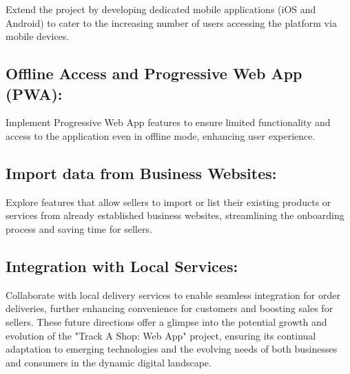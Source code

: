 Extend the project by developing dedicated mobile applications (iOS and Android) to cater to the increasing number of users accessing the platform via mobile devices.

\subsection{Offline Access and Progressive Web App (PWA):}

Implement Progressive Web App features to ensure limited functionality and access to the application even in offline mode, enhancing user experience.

\subsection{Import data from Business Websites:}

Explore features that allow sellers to import or list their existing products or services from already established business websites, streamlining the onboarding process and saving time for sellers.

\subsection{Integration with Local Services:}

Collaborate with local delivery services to enable seamless integration for order deliveries, further enhancing convenience for customers and boosting sales for sellers.
These future directions offer a glimpse into the potential growth and evolution of the "Track A Shop: Web App" project, ensuring its continual adaptation to emerging technologies and the evolving needs of both businesses and consumers in the dynamic digital landscape.

